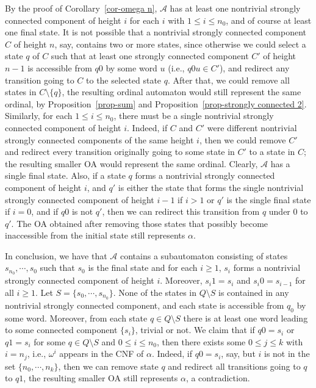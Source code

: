 \documentclass[copyright]{eptcs}
\newcommand{\cA}{\mathcal{A}}
\begin{document}
By the proof of Corollary~\ref{cor-omega n}, $\cA$ has at least one nontrivial 
strongly connected component  of height $i$ for each $i$ with $1 \leq i \leq n_0$, 
and of course  at least one final state. 
It is not possible that a nontrivial strongly connected 
component $C$ of height $n$, say,  contains two or more states, since otherwise 
we could select a state $q$ of $C$ such that at least 
one strongly connected component $C'$ of height $n-1$ is accessible 
from $q0$ by some word $u$ (i.e., $q0u \in C'$), and redirect any transition going to $C$ to 
the selected  state $q$. After that, 
we could remove all states in $C \setminus \{q\}$, the resulting ordinal 
automaton would still represent the same ordinal, by 
Proposition~\ref{prop-sum} and Proposition~\ref{prop-strongly connected 2}. 
Similarly, for each $1 \leq i \leq n_0$, there must be a single nontrivial
strongly connected component of height $i$. Indeed, if $C$ and $C'$ 
were different nontrivial strongly connected components of the 
same height $i$, then we could remove $C'$ and redirect every transition 
originally going to some state in $C'$ to a state in $C$; 
the resulting smaller OA would represent the 
same ordinal. Clearly, $\cA$  has a single final state. 
Also, if a state $q$ forms a nontrivial strongly connected component 
of height $i$, and $q'$ is either the state that forms the single 
nontrivial strongly connected component of height $i-1$ if $i>1$ 
or $q'$ is the single final state if $i =0$, and if $q0$ is not $q'$,
then we can redirect this transition from $q$ under $0$ to $q'$. The OA obtained after removing 
those states that possibly become inaccessible from the initial state 
 still represents $\alpha$. 

In conclusion, we have that $\cA$ contains a subautomaton consisting 
of states $s_{n_0},\cdots,s_0$ such that $s_{0}$ is the final state
and for each $i \geq 1$, $s_i$ forms a nontrivial strongly connected component of height $i$.
Moreover, $s_i 1 = s_i$ and $s_i 0 = s_{i-1}$ for all $i\geq  1$. 
Let $S = \{s_0,\cdots,s_{n_0}\}$. 
None of the states in $Q\setminus S$ is contained in any nontrivial strongly
connected component, and each state is accessible from $q_0$
by some word. Moreover, from each state $q \in Q\setminus S$ there is at least 
one word leading to some connected component $\{s_i\}$, 
trivial or not. We claim that if $q0 = s_i$ or $q1 = s_i$ for some $q \in Q\setminus S$ 
and $0\leq i \leq n_0$, then there exists some $0 \leq j \leq k$ 
with $i = n_j$, i.e., $\omega^i$ appears in the CNF of $\alpha$.
Indeed, if $q0 = s_i$, say,  but $i$ is not in the set $\{n_0,\cdots,n_k\}$,
then we can remove state $q$ and redirect all transitions going to 
$q$ to $q1$, the resulting smaller OA still represents $\alpha$,
a contradiction.  
\end{document}

